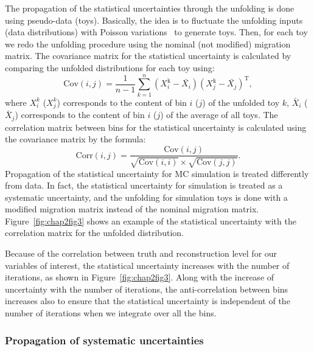 The propagation of the statistical uncertainties through the unfolding is done using pseudo-data (toys). Basically, the idea is to fluctuate the unfolding inputs (data distributions) with Poisson variations~\cite{2002JHEP09060B} to generate toys. Then, for each toy we redo the unfolding procedure using the nominal (not modified) migration matrix. The covariance matrix for the statistical uncertainty is calculated by comparing the unfolded distributions for each toy using:
%
\begin{equation}
\mathrm{Cov}(i,j)=\frac{1}{n-1} \sum_{k=1}^{n}\left(X^{\mathrm{k}}_{i}-\bar{X_{i}}\right)\left(X_{j}^{\mathrm{k}}-\bar{X_{j}}\right)^{\mathrm{T}},
\end{equation}
%
\noindent where {$X_{i}^{k}$} ({$X_{j}^{k}$}) corresponds to the content of bin {$i$ ($j$)} of the unfolded toy $k$, {$\bar{X}_{i}$} ({$\bar{X}_{j}$}) corresponds to the content of bin $i$ ($j$) of the average of all toys. The correlation matrix between bins for the statistical uncertainty is calculated using the covariance matrix by the formula:
\begin{equation}
\mathrm{Corr}(i,j)=\frac{\mathrm{Cov}(i,j)}{ \sqrt{\mathrm{Cov}(i,i)} \times \sqrt{\mathrm{Cov}(j,j)} }.
\end{equation}
%
\noindent Propagation of the statistical uncertainty for MC simulation is treated differently from data. In fact, the statistical uncertainty for simulation is treated as a systematic uncertainty, and the unfolding for simulation toys is done with a modified migration matrix instead of the nominal migration matrix. Figure~\ref{fig:chap2fig3} shows an example of the statistical uncertainty with the correlation matrix for the unfolded distribution.


Because of the correlation between truth and reconstruction level for our variables of interest, the statistical uncertainty increases with the number of iterations, as shown in Figure~\ref{fig:chap2fig3}. Along with the increase of uncertainty with the number of iterations, the anti-correlation between bins increases also to ensure that the statistical uncertainty is independent of the number of iterations when we integrate over all the bins.

\subsubsection{Propagation of systematic uncertainties}

